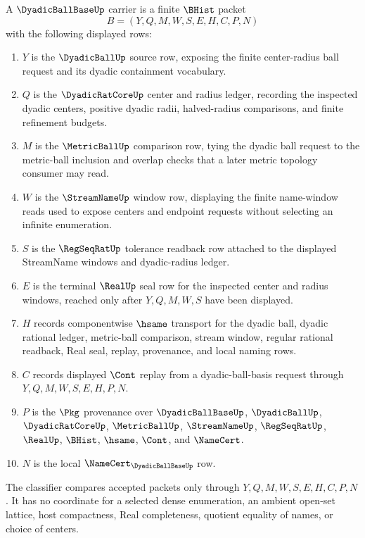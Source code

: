 \begin{definition}
\label{def:dyadic-ball-base-carrier}
A $\DyadicBallBaseUp$ carrier is a finite $\BHist$ packet
$$
B=(Y,Q,M,W,S,E,H,C,P,N)
$$
with the following displayed rows:
\begin{enumerate}
\item $Y$ is the $\DyadicBallUp$ source row, exposing the finite center-radius ball request and its dyadic containment vocabulary.
\item $Q$ is the $\DyadicRatCoreUp$ center and radius ledger, recording the inspected dyadic centers, positive dyadic radii, halved-radius comparisons, and finite refinement budgets.
\item $M$ is the $\MetricBallUp$ comparison row, tying the dyadic ball request to the metric-ball inclusion and overlap checks that a later metric topology consumer may read.
\item $W$ is the $\StreamNameUp$ window row, displaying the finite name-window reads used to expose centers and endpoint requests without selecting an infinite enumeration.
\item $S$ is the $\RegSeqRatUp$ tolerance readback row attached to the displayed StreamName windows and dyadic-radius ledger.
\item $E$ is the terminal $\RealUp$ seal row for the inspected center and radius windows, reached only after $Y,Q,M,W,S$ have been displayed.
\item $H$ records componentwise $\hsame$ transport for the dyadic ball, dyadic rational ledger, metric-ball comparison, stream window, regular rational readback, Real seal, replay, provenance, and local naming rows.
\item $C$ records displayed $\Cont$ replay from a dyadic-ball-basis request through $Y,Q,M,W,S,E,H,P,N$.
\item $P$ is the $\Pkg$ provenance over $\DyadicBallBaseUp$, $\DyadicBallUp$, $\DyadicRatCoreUp$, $\MetricBallUp$, $\StreamNameUp$, $\RegSeqRatUp$, $\RealUp$, $\BHist$, $\hsame$, $\Cont$, and $\NameCert$.
\item $N$ is the local $\NameCert_{\DyadicBallBaseUp}$ row.
\end{enumerate}
The classifier compares accepted packets only through $Y,Q,M,W,S,E,H,C,P,N$. It has no coordinate for a selected dense enumeration, an ambient open-set lattice, host compactness, Real completeness, quotient equality of names, or choice of centers.
\end{definition}

